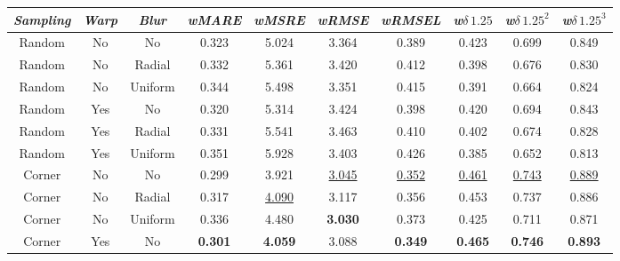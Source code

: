 \begin{table}
    \begin{adjustwidth}{-0.2\textwidth}{-0.2\textwidth}
    \centering
    \begin{tabular}{c|c|c|c|c|c|c|c|c|c}
        \emph{Sampling} & \emph{Warp} & \emph{Blur} & \emph{wMARE} & \emph{wMSRE} & \emph{wRMSE} & \emph{wRMSEL} & \emph{w$\delta \, 1.25$} & \emph{w$\delta \, 1.25^{2}$} & \emph{w$\delta \, 1.25^{3}$} \\
        \hline
        Random & No  & No      &             0.323  &            5.024  &            3.364  &            0.389  &            0.423  &            0.699  &            0.849  \\
        Random & No  & Radial  &             0.332  &            5.361  &            3.420  &            0.412  &            0.398  &            0.676  &            0.830  \\
        Random & No  & Uniform &             0.344  &            5.498  &            3.351  &            0.415  &            0.391  &            0.664  &            0.824  \\
        Random & Yes & No      &             0.320  &            5.314  &            3.424  &            0.398  &            0.420  &            0.694  &            0.843  \\
        Random & Yes & Radial  &             0.331  &            5.541  &            3.463  &            0.410  &            0.402  &            0.674  &            0.828  \\
        Random & Yes & Uniform &             0.351  &            5.928  &            3.403  &            0.426  &            0.385  &            0.652  &            0.813  \\
        Corner & No  & No      &             0.299  &            3.921  & \underline{3.045} & \underline{0.352} & \underline{0.461} & \underline{0.743} & \underline{0.889} \\
        Corner & No  & Radial  &             0.317  & \underline{4.090} &            3.117  &            0.356  &            0.453  &            0.737  &            0.886  \\
        Corner & No  & Uniform &             0.336  &            4.480  &    \textbf{3.030} &            0.373  &            0.425  &            0.711  &            0.871  \\
        Corner & Yes & No      &     \textbf{0.301} &    \textbf{4.059} &            3.088  &    \textbf{0.349} &    \textbf{0.465} &    \textbf{0.746} &    \textbf{0.893} \\

\end{tabular}
\end{adjustwidth}
\end{table}
